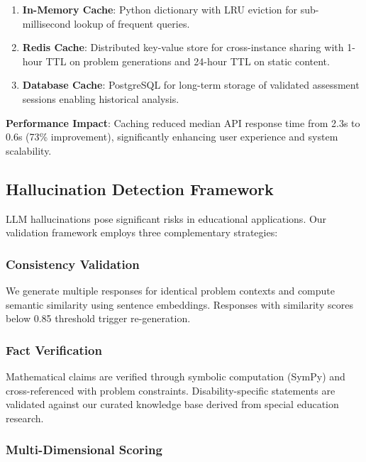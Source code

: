 \documentclass[11pt]{article}
\begin{document}
\begin{enumerate}
    \item \textbf{In-Memory Cache}: Python dictionary with LRU eviction for sub-millisecond lookup of frequent queries.
    
    \item \textbf{Redis Cache}: Distributed key-value store for cross-instance sharing with 1-hour TTL on problem generations and 24-hour TTL on static content.
    
    \item \textbf{Database Cache}: PostgreSQL for long-term storage of validated assessment sessions enabling historical analysis.
\end{enumerate}

\textbf{Performance Impact}: Caching reduced median API response time from 2.3s to 0.6s (73\% improvement), significantly enhancing user experience and system scalability.

\subsection{Hallucination Detection Framework}

LLM hallucinations pose significant risks in educational applications. Our validation framework employs three complementary strategies:

\subsubsection{Consistency Validation}

We generate multiple responses for identical problem contexts and compute semantic similarity using sentence embeddings. Responses with similarity scores below 0.85 threshold trigger re-generation.

\subsubsection{Fact Verification}

Mathematical claims are verified through symbolic computation (SymPy) and cross-referenced with problem constraints. Disability-specific statements are validated against our curated knowledge base derived from special education research.

\subsubsection{Multi-Dimensional Scoring}
\end{document}
